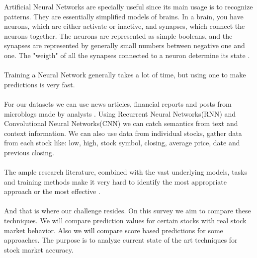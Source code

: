 \documentclass[conference]{IEEEtran}
\begin{document}
Artificial Neural Networks are specially useful since its main usage is to recognize patterns. They are essentially simplified models of brains. In a brain, you have neurons, which are either activate or inactive,
and synapses, which connect the neurons together. The neurons are represented as simple booleans, and the synapses are represented by generally small numbers between negative one and one. The "weigth" of all the
synapses connected to a neuron determine its state \cite{M2018}.
\\\\
Training a Neural Network generally takes a lot of time, but using one to make predictions is very fast.
\\\\
For our datasets we can use news articles, financial reports and posts from microblogs made by analysts \cite{Vargas2017}. Using Recurrent Neural Networks(RNN) and Convolutional Neural Networks(CNN) we can
catch semantics from text and context information. We can also use data from individual stocks, gather data from each stock like: low, high, stock symbol, closing, average price, date and previous closing\cite{M2018}.
\\\\
The ample research literature, combined with the vast underlying models, tasks and training methods make it very
hard to identify the most appropriate approach or the most effective \cite{raghu2020survey}.
\\\\
And that is where our challenge resides. On this survey we aim to compare these techniques. We will compare prediction values for certain stocks with real stock market behavior. Also we will compare score based predictions for some approaches.
The purpose is to analyze current state of the art techniques for stock market accuracy\cite{Singh2016}.
\end{document}
